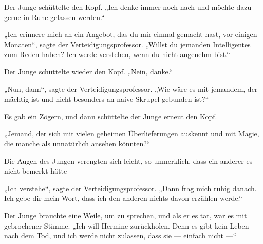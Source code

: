 Der Junge schüttelte den Kopf.
„Ich denke immer noch nach und möchte dazu gerne in Ruhe gelassen werden.“

„Ich erinnere mich an ein Angebot, das du mir einmal gemacht hast, vor einigen Monaten“, sagte der Verteidigungsprofessor.
„Willst du jemanden Intelligentes zum Reden haben? Ich werde verstehen, wenn du nicht angenehm bist.“

Der Junge schüttelte wieder den Kopf.
„Nein, danke.“

„Nun, dann“, sagte der Verteidigungsprofessor.
„Wie wäre es mit jemandem, der mächtig ist und nicht besonders an naive Skrupel gebunden ist?“

Es gab ein Zögern, und dann schüttelte der Junge erneut den Kopf.

„Jemand, der sich mit vielen geheimen Überlieferungen auskennt und mit Magie, die manche als unnatürlich ansehen könnten?“

Die Augen des Jungen verengten sich leicht, so unmerklich, dass ein anderer es nicht bemerkt hätte —

„Ich verstehe“, sagte der Verteidigungsprofessor.
„Dann frag mich ruhig danach. Ich gebe dir mein Wort, dass ich den anderen nichts davon erzählen werde.“


Der Junge brauchte eine Weile, um zu sprechen, und als er es tat, war es mit gebrochener Stimme.
„Ich will Hermine zurückholen. Denn es gibt kein Leben nach dem Tod, und ich werde nicht zulassen, dass sie — einfach nicht —“


